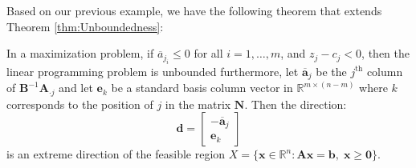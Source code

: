 Based on our previous example, we have the following theorem that extends Theorem \ref{thm:Unboundedness}:
\begin{theorem} In a maximization problem, if $\overline{a}_{j_i} \leq 0$ for all $i = 1,\dots,m$, and $z_j - c_j < 0$, then the linear programming problem is unbounded furthermore, let $\overline{\mathbf{a}}_j$ be the $j^{\text{th}}$ column of $\mathbf{B}^{-1}\mathbf{A}_{\cdot j}$ and let $\mathbf{e}_k$ be a standard basis column vector in $\mathbb{R}^{m \times (n-m)}$ where $k$ corresponds to the position of $j$ in the matrix $\mathbf{N}$. Then the direction:
\begin{equation}
\mathbf{d} = \begin{bmatrix}
-\overline{\mathbf{a}}_j\\
\mathbf{e}_k
\end{bmatrix}
\end{equation}
is an extreme direction of the feasible region $X = \{\mathbf{x} \in \mathbb{R}^n : \mathbf{A}\mathbf{x} = \mathbf{b},\;\mathbf{x} \geq \mathbf{0}\}$.
\label{thm:ExtremeDirectionSimplex} 
\end{theorem}
